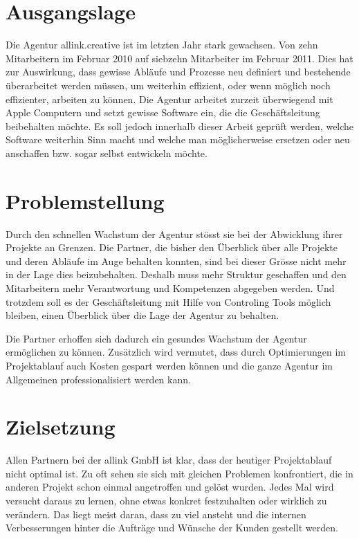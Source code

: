 \section{Ausgangslage}
Die Agentur allink.creative ist im letzten Jahr stark gewachsen. Von zehn
Mitarbeitern im Februar 2010 auf siebzehn Mitarbeiter im Februar 2011. Dies hat 
zur Auswirkung, dass gewisse Abläufe und Prozesse neu definiert und bestehende
überarbeitet werden müssen, um weiterhin effizient, oder wenn möglich noch 
effizienter, arbeiten zu können. Die Agentur arbeitet zurzeit überwiegend mit Apple
Computern und setzt gewisse Software ein, die die Geschäftsleitung beibehalten 
möchte. Es soll jedoch innerhalb dieser Arbeit geprüft werden, welche Software
weiterhin Sinn macht und welche man möglicherweise ersetzen oder neu anschaffen
bzw. sogar selbst entwickeln möchte.

\section{Problemstellung}
Durch den schnellen Wachstum der Agentur stösst sie bei der Abwicklung ihrer
Projekte an Grenzen. Die Partner, die bisher den Überblick über alle
Projekte und deren Abläufe im Auge behalten konnten, sind bei dieser Grösse
nicht mehr in der Lage dies beizubehalten. Deshalb muss mehr Struktur geschaffen und
den Mitarbeitern mehr Verantwortung und Kompetenzen abgegeben werden. Und trotzdem
soll es der Geschäftsleitung mit Hilfe von Controling Tools möglich bleiben,
einen Überblick über die Lage der Agentur zu behalten.

Die Partner erhoffen sich dadurch ein gesundes Wachstum der Agentur ermöglichen
zu können. Zusätzlich wird vermutet, dass durch Optimierungen im Projektablauf
auch Kosten gespart werden können und die ganze Agentur im Allgemeinen 
professionalisiert werden kann.

\section{Zielsetzung}
Allen Partnern bei der allink GmbH ist klar, dass der
heutiger Projektablauf nicht optimal ist. Zu oft sehen sie sich mit gleichen
Problemen konfrontiert, die in anderen Projekt schon einmal angetroffen und gelöst wurden.
Jedes Mal wird versucht daraus zu lernen, ohne etwas konkret festzuhalten oder
wirklich zu verändern. Das liegt meist daran, dass zu viel ansteht und
die internen Verbesserungen hinter die Aufträge und Wünsche der Kunden
gestellt werden.

